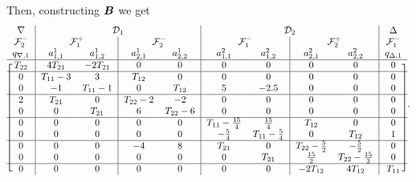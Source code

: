 Then, constructing \({  \boldsymbol B}\) we get 
\[
\begin{blockarray}{c|cc|cc|cc|cc|c}
\nabla & \BAmulticolumn{4}{c|}{\calD_1} & \BAmulticolumn{4}{c|}{\calD_2} & \Delta\\
\calF_2^- & \BAmulticolumn{2}{c|}{\calF_1^+} & \BAmulticolumn{2}{c|}{\calF_2^-} & \BAmulticolumn{2}{c|}{\calF_1^-} & \BAmulticolumn{2}{c|}{\calF_2^+} & \calF_1^-\\
q_{\nabla,1} & a_{1,1}^1 & a_{1,2}^1 & a_{2,1}^1 & a_{2,2}^1 & a_{1,1}^2 & a_{1,2}^2 & a_{2,1}^2 & a_{2,2}^2 & q_{\Delta,1}\\\BAhline
\begin{block}{[c|cc|cc|cc|cc|c]} 
T_{22} & 4T_{21} & -2T_{21} & 0 & 0 & 0 & 0 & 0 & 0 & 0\\\BAhline
0 & T_{11}-3 & 3 & T_{12} & 0 & 0 & 0 & 0 & 0 & 0 \\
0 & -1 & T_{11}-1 & 0 & T_{12} & 5 & -2.5 & 0 & 0 & 0 \\\BAhline 
2 & T_{21} & 0 & T_{22}-2 & -2 & 0 & 0 & 0 & 0 & 0 \\ 
0 & 0 & T_{21} & 6 & T_{22}-6 & 0 & 0 & 0 & 0 & 0\\\BAhline
0 & 0 & 0 & 0 & 0 & T_{11}-\frac{15}{4} & \frac{15}{4} & T_{12} & 0 & 0 \\ 
0 & 0 & 0 & 0 & 0 & -\frac{5}{4} & T_{11}-\frac{5}{4} & 0 & T_{12} &1\\\BAhline
0 & 0 & 0 & -4 & 8 & T_{21} & 0 & T_{22}-\frac{5}{2} & -\frac{5}{2} & 0 \\
0 & 0 & 0 & 0 & 0 & 0 & T_{21} & \frac{15}{2} & T_{22}-\frac{15}{2} & 0 \\\BAhline
0 & 0 & 0 & 0 & 0 & 0 & 0 & -2T_{12} & 4T_{12} & T_{11} \\
\end{block}
\end{blockarray}.
\]

